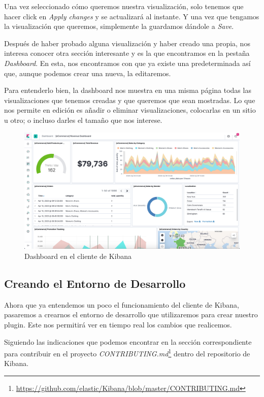 \documentclass[a4paper, 12pt]{book}
\begin{document}
Una vez seleccionado cómo queremos nuestra visualización, solo tenemos que hacer click en \textit{Apply changes} y se actualizará al instante. Y una vez que tengamos la visualización que queremos, simplemente la guardamos dándole a \textit{Save}.

Después de haber probado alguna visualización y haber creado una propia, nos interesa conocer otra sección interesante y es la que encontramos en la pestaña \textit{Dashboard}. En esta, nos encontramos con que ya existe una predeterminada así que, aunque podemos crear una nueva, la editaremos.

Para entenderlo bien, la dashboard nos muestra en una misma página todas las visualizaciones que tenemos creadas y que queremos que sean mostradas. Lo que nos permite en edición es añadir o eliminar visualizaciones, colocarlas en un sitio u otro; o incluso darles el tamaño que nos interese.

\begin{figure}[H]
  \centering
  \includegraphics[width=12cm, keepaspectratio]{img/development/kibana-dashboard.png}
  \caption{Dashboard en el cliente de Kibana}
  \label{fig:Kibanadashboard}
\end{figure}


\subsection{Creando el Entorno de Desarrollo}
\label{sec:entorno}

Ahora que ya entendemos un poco el funcionamiento del cliente de Kibana, pasaremos a crearnos el entorno de desarrollo que utilizaremos para crear nuestro plugin. Este nos permitirá ver en tiempo real los cambios que realicemos.

Siguiendo las indicaciones que podemos encontrar en la sección correspondiente para contribuir en el proyecto \textit{CONTRIBUTING.md}\footnote{\url{https://github.com/elastic/Kibana/blob/master/CONTRIBUTING.md}} dentro del repositorio de Kibana.
\end{document}
